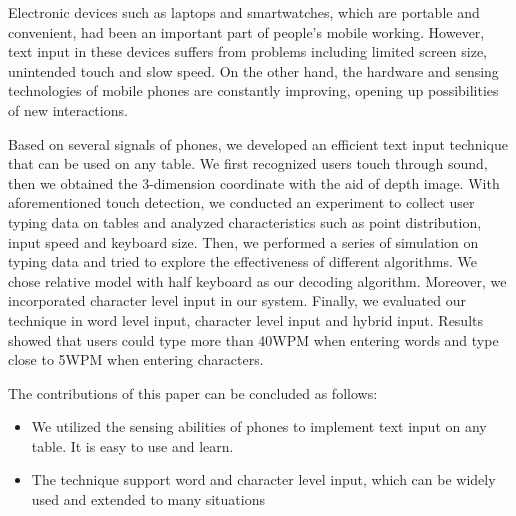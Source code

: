 \begin{abstract*}
    Electronic devices such as laptops and smartwatches, which are portable and convenient, had been an important part of people's mobile working. However, text input in these devices suffers from problems including limited screen size, unintended touch and slow speed. On the other hand, the hardware and sensing technologies of mobile phones are constantly improving, opening up possibilities of new interactions.
    
    Based on several signals of phones, we developed an efficient text input technique that can be used on any table. We first recognized users touch through sound, then we obtained the 3-dimension coordinate with the aid of depth image. With aforementioned touch detection, we conducted an experiment to collect user typing data on tables and analyzed characteristics such as point distribution, input speed and keyboard size. Then, we performed a series of simulation on typing data and tried to explore the effectiveness of different algorithms. We chose relative model with half keyboard as our decoding algorithm. Moreover, we incorporated character level input in our system. Finally, we evaluated our technique in word level input, character level input and hybrid input. Results showed that users could type more than 40WPM when entering words and type close to 5WPM when entering characters.
    
    The contributions of this paper can be concluded as follows:
    \begin{itemize}
        \item We utilized the sensing abilities of phones to implement text input on any table. It is easy to use and learn.
        \item The technique support word and character level input, which can be widely used and extended to many situations
    \end{itemize}
\end{abstract*}
